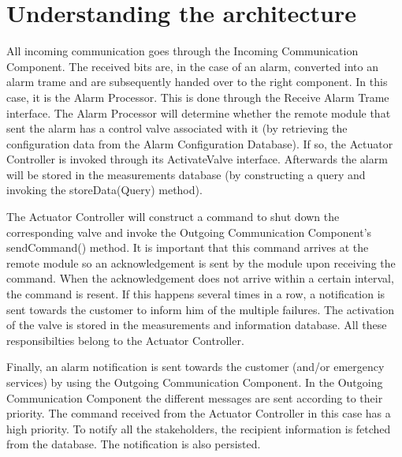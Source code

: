 \chapter{Understanding the architecture}
\label{chap:understanding-architecture}

\npar All incoming communication goes through the Incoming Communication
Component. The received bits are, in the case of an alarm,  converted into an
alarm trame and are subsequently handed over to the right component. In this
case, it is the Alarm Processor. This is done through the Receive Alarm Trame
interface. The Alarm Processor will determine whether the remote module that
sent the alarm has a control valve associated with it (by retrieving the
configuration data from the Alarm Configuration Database). If so, the Actuator
Controller is invoked through its ActivateValve interface. Afterwards the alarm
will be stored in the measurements database (by constructing a query and
invoking the storeData(Query) method).

\npar The Actuator Controller will construct a command to shut down the
corresponding valve and invoke the Outgoing Communication Component’s
sendCommand() method. It is important that this command arrives at the remote
module so an acknowledgement is sent by the module upon receiving the
command. When the acknowledgement does not arrive within a certain interval, the
command is resent. If this happens several times in a row, a notification is
sent towards the customer to inform him of the multiple failures. The activation
of the valve is stored in the measurements and information database. All these
responsibilties belong to the Actuator Controller.

\npar Finally, an alarm notification is sent towards the customer (and/or
emergency services) by using the Outgoing Communication Component. In the
Outgoing Communication Component the different messages are sent according to
their priority. The command received from the Actuator Controller in this
case has a high priority. To notify all the stakeholders, the recipient
information is fetched from the database. The notification is also persisted.
